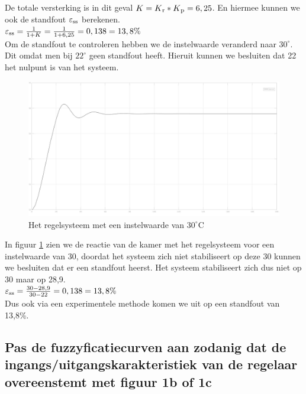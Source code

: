 \documentclass[a4paper, 12pt]{article}
\begin{document}
De totale versterking is in dit geval $K = K\textsubscript{r} * K\textsubscript{p} = 6,25$. En hiermee kunnen we ook de standfout $\varepsilon\textsubscript{ss}$ berekenen. \\
$\varepsilon\textsubscript{ss} = \frac{1}{1+K} = \frac{1}{1+6,25} = 0,138 = 13,8\%$\\

Om de standfout te controleren hebben we de instelwaarde veranderd naar $30^\circ$. Dit omdat men bij $22^\circ$ geen standfout heeft. Hieruit kunnen we besluiten dat 22 het nulpunt is van het systeem. \\

\begin{figure}[!h]
	\includegraphics[width=1\linewidth]{Labo4_1_step_response_kamer_standfout.jpg}
	\caption {Het regelsysteem met een instelwaarde van $30^\circ$C}
	\label{fig:standfout}
\end{figure}

\newpage

In figuur \ref{fig:standfout} zien we de reactie van de kamer met het regelsysteem voor een instelwaarde van 30, doordat het systeem zich niet stabiliseert op deze 30 kunnen we besluiten dat er een standfout heerst. Het systeem stabiliseert zich dus niet op 30 maar op 28,9.\\
$\varepsilon\textsubscript{ss} = \frac{30-28,9}{30-22} = 0,138 = 13,8\%$\\
Dus ook via een experimentele methode komen we uit op een standfout van 13,8\%.

\subsection{Pas de fuzzyficatiecurven aan zodanig dat de ingangs/uitgangskarakteristiek van de regelaar overeenstemt met figuur 1b of 1c}
\end{document}
